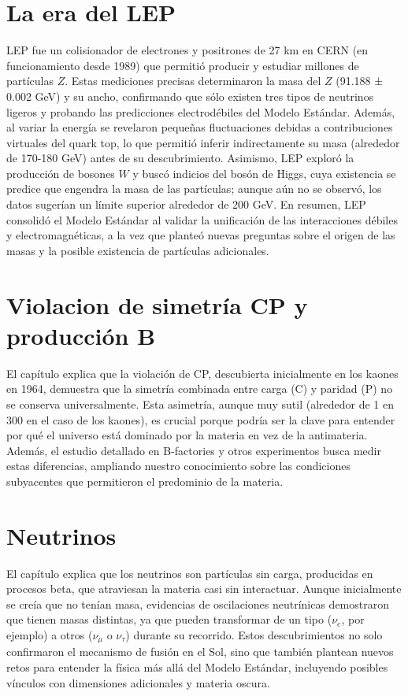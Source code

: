 \documentclass[12pt]{article}
\begin{document}
\section{La era del LEP}
LEP fue un colisionador de electrones y positrones de 27 km en CERN (en funcionamiento desde 1989) que permitió producir y estudiar millones de partículas $Z$. Estas mediciones precisas determinaron la masa del $Z$ (91.188 ± 0.002 GeV) y su ancho, confirmando que sólo existen tres tipos de neutrinos ligeros y probando las predicciones electrodébiles del Modelo Estándar. Además, al variar la energía se revelaron pequeñas fluctuaciones debidas a contribuciones virtuales del quark top, lo que permitió inferir indirectamente su masa (alrededor de 170-180 GeV) antes de su descubrimiento. Asimismo, LEP exploró la producción de bosones $W$ y buscó indicios del bosón de Higgs, cuya existencia se predice que engendra la masa de las partículas; aunque aún no se observó, los datos sugerían un límite superior alrededor de 200 GeV. En resumen, LEP consolidó el Modelo Estándar al validar la unificación de las interacciones débiles y electromagnéticas, a la vez que planteó nuevas preguntas sobre el origen de las masas y la posible existencia de partículas adicionales.

\section{Violacion de simetría CP y producción B}
El capítulo explica que la violación de CP, descubierta inicialmente en los kaones en 1964, demuestra que la simetría combinada entre carga (C) y paridad (P) no se conserva universalmente. Esta asimetría, aunque muy sutil (alrededor de 1 en 300 en el caso de los kaones), es crucial porque podría ser la clave para entender por qué el universo está dominado por la materia en vez de la antimateria. Además, el estudio detallado en B-factories y otros experimentos busca medir estas diferencias, ampliando nuestro conocimiento sobre las condiciones subyacentes que permitieron el predominio de la materia.

\section{Neutrinos}
El capítulo explica que los neutrinos son partículas sin carga, producidas en procesos beta, que atraviesan la materia casi sin interactuar. Aunque inicialmente se creía que no tenían masa, evidencias de oscilaciones neutrínicas demostraron que tienen masas distintas, ya que pueden transformar de un tipo ($\nu_{e}$, por ejemplo) a otros ($\nu_{\mu}$ o $\nu_{\tau}$) durante su recorrido. Estos descubrimientos no solo confirmaron el mecanismo de fusión en el Sol, sino que también plantean nuevos retos para entender la física más allá del Modelo Estándar, incluyendo posibles vínculos con dimensiones adicionales y materia oscura.
\end{document}
